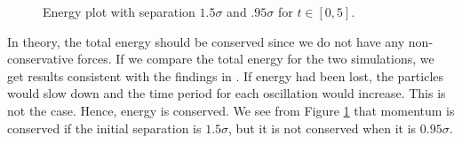 \documentclass[a4paper,10pt,english]{article}
\begin{document}
\begin{figure}[h]
\begin{minipage}{0.5\textwidth}
    \end{minipage}
    \caption{Energy plot with separation $1.5\sigma$ and $.95\sigma$ for $t\in[0, 5]$.}
    \label{fig:energyplots1}
\end{figure}

\newpage

In theory, the total energy should be conserved since we do not have any non-conservative forces. If we compare the total energy for the two simulations, we get results consistent with the findings in \textit{}. If energy had been lost, the particles would slow down and the time period for each oscillation would increase. This is not the case. Hence, energy is conserved. We see from Figure \ref{fig:energyplots1} that momentum is conserved if the initial separation is $1.5 \sigma$, but it is not conserved when it is $0.95 \sigma$.
\end{document}

